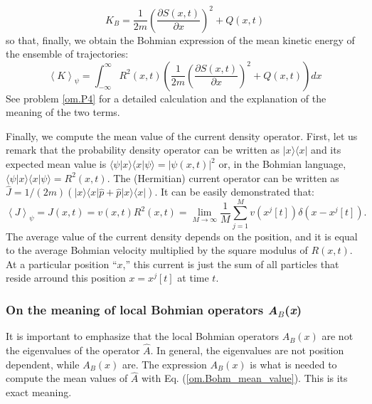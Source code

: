 \documentclass[onecolumn,nofootinbib, secnumarabic, amsmath, nobibnotes,11pt,aps,pra]{revtex4-1}
\newcommand{\ket}[1]{\ensuremath{|#1\rangle}}
\newcommand{\bra}[1]{\ensuremath{\langle#1|}}
\newcommand{\braket}[2]{\langle#1|#2\rangle}
\newcommand{\eref}[1]{Eq. (\ref{#1})}
\newcommand{\abs}[1]{\left| #1 \right|} %
\newcommand{\avg}[1]{\left\langle #1 \right\rangle} %
\begin{document}
\begin{equation}
\label{om.local_kinetic_energy_mean_B_bis}
K_B = \frac {1} {2m}\left(\frac {\partial S(x,t)} {\partial x} \right)^2 + Q(x,t)
\end{equation}
so that, finally, we obtain the Bohmian expression of the mean kinetic energy of the ensemble of trajectories:
\begin{equation}
\label{om.kinetic_energy_mean_B}
\avg{K}_{\psi} = \int_{-\infty}^{\infty} R^2(x,t) \left( \frac {1} {2m} \left(\frac {\partial S(x,t)} {\partial x} \right)^2 + Q(x,t)\right) dx
\end{equation}
See problem \ref{om.P4} for a detailed calculation and the explanation of the meaning of the two terms.

Finally, we compute the mean value of the current density operator. First, let us remark that the probability density operator can be written as $\ket{x}\bra{x}$ and its expected mean value is $\braket{\psi}{x} \braket{x}{\psi} = \abs{\psi(x,t)}^2$ or, in the Bohmian language, $\braket{\psi}{x} \braket{x}{\psi} = R^2(x,t)$. The (Hermitian) current operator can be written as $\hat{J} = 1/(2m) (\ket{x}\bra{x}\hat{p} + \hat{p}\ket{x}\bra{x})$. It can be easily demonstrated that:
\begin{equation}
\avg{J}_{\psi}=J(x,t)=v(x,t) R^2(x,t)=\lim_{M\rightarrow\infty} \frac {1} {M} \sum_{j=1}^{M} v(x^j[t]) \delta(x-x^j[t]).
\end{equation}
The average value of the current density depends on the position,
and it is equal to the average Bohmian velocity multiplied by the
square modulus of $R(x,t)$. At a particular position ``$x$,'' this
current is just the sum of all particles that reside arround this
position $x = x^j[t]$ at time $t$.

\subsubsection{On the meaning of local Bohmian operators \textit{A}$_\textit{B}$(\textit{x})}

It is important to emphasize that the local Bohmian operators
$A_B(x)$ are not the eigenvalues of the operator $\hat{A}$. In
general, the eigenvalues are not position dependent, while $A_B(x)$
are. The expression $A_B(x)$ is what is needed to compute the mean
values of $\hat{A}$ with \eref{om.Bohm_mean_value}. This is its
exact meaning.
\end{document}
